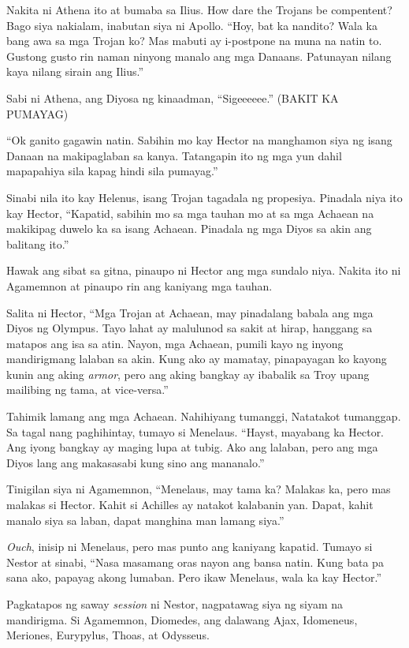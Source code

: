 \documentclass[12pt,letterpaper]{report}
\begin{document}
Nakita ni Athena ito at bumaba sa Ilius. How dare the Trojans be compentent? Bago siya nakialam, inabutan siya ni Apollo. ``Hoy, bat ka nandito? Wala ka bang awa sa mga Trojan ko? Mas mabuti ay i-postpone na muna na natin to. Gustong gusto rin naman ninyong manalo ang mga Danaans. Patunayan nilang kaya nilang sirain ang Ilius.''

Sabi ni Athena, ang Diyosa ng kinaadman, ``Sigeeeeee.'' (BAKIT KA PUMAYAG)

``Ok ganito gagawin natin. Sabihin mo kay Hector na manghamon siya ng isang Danaan na makipaglaban sa kanya. Tatangapin ito ng mga yun dahil mapapahiya sila kapag hindi sila pumayag.''

Sinabi nila ito kay Helenus, isang Trojan tagadala ng propesiya. Pinadala niya ito kay Hector, ``Kapatid, sabihin mo sa mga tauhan mo at sa mga Achaean na makikipag duwelo ka sa isang Achaean. Pinadala ng mga Diyos sa akin ang balitang ito.''

Hawak ang sibat sa gitna, pinaupo ni Hector ang mga sundalo niya. Nakita ito ni Agamemnon at pinaupo rin ang kaniyang mga tauhan.

Salita ni Hector, ``Mga Trojan at Achaean, may pinadalang babala ang mga Diyos ng Olympus. Tayo lahat ay malulunod sa sakit at hirap, hanggang sa matapos ang isa sa atin. Nayon, mga Achaean, pumili kayo ng inyong mandirigmang lalaban sa akin. Kung ako ay mamatay, pinapayagan ko kayong kunin ang aking \textit{armor}, pero ang aking bangkay ay ibabalik sa Troy upang mailibing ng tama, at vice-versa.''

Tahimik lamang ang mga Achaean. Nahihiyang tumanggi, Natatakot tumanggap. Sa tagal nang paghihintay, tumayo si Menelaus. ``Hayst, mayabang ka Hector. Ang iyong bangkay ay maging lupa at tubig. Ako ang lalaban, pero ang mga Diyos lang ang makasasabi kung sino ang mananalo.''

Tinigilan siya ni Agamemnon, ``Menelaus, may tama ka? Malakas ka, pero mas malakas si Hector. Kahit si Achilles ay natakot kalabanin yan. Dapat, kahit manalo siya sa laban, dapat manghina man lamang siya.''

\textit{Ouch}, inisip ni Menelaus, pero mas punto ang kaniyang kapatid. Tumayo si Nestor at sinabi, ``Nasa masamang oras nayon ang bansa natin. Kung bata pa sana ako, papayag akong lumaban. Pero ikaw Menelaus, wala ka kay Hector.''

Pagkatapos ng saway \textit{session} ni Nestor, nagpatawag siya ng siyam na mandirigma. Si Agamemnon, Diomedes, ang dalawang Ajax, Idomeneus, Meriones, Eurypylus, Thoas, at Odysseus.
\end{document}
